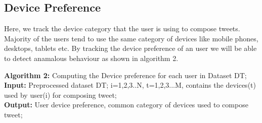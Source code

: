 \documentclass[conference]{IEEEtran}
\DeclarePairedDelimiter\floor{\lfloor}{\rfloor}
\begin{document}

\subsection{Device Preference}
Here, we track the device category that the user is using to compose tweets. Majority of the users tend to use the same category of devices like mobile phones, desktops, tablets etc. By tracking the device preference of an user we will be able to detect anamalous behaviour as shown in algorithm 2.

\textbf{Algorithm 2:} Computing the Device preference for each user in Dataset DT; \\
\textbf{Input:} Preprocessed dataset DT; i=1,2,3..N, t=1,2,3...M, contains the devices(t) used by user(i) for composing tweet;\\
\textbf{Output:} User device preference, common category of devices used to compose tweet; \\
\end{document}
